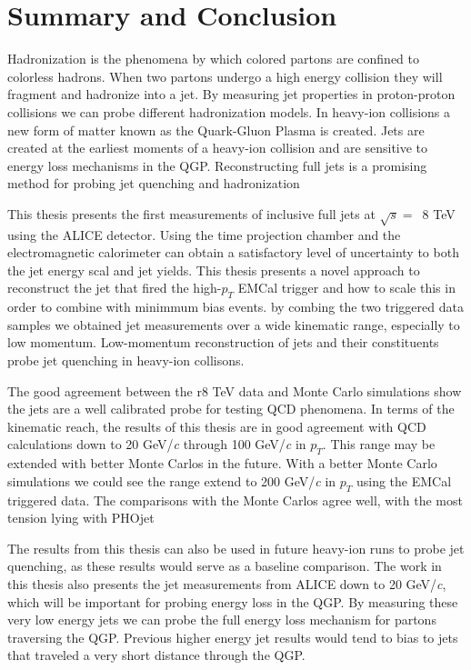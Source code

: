 \section{Summary and Conclusion}

Hadronization is the phenomena by which colored partons are confined to colorless hadrons.  When two partons undergo a high energy collision they will fragment and hadronize into a jet.  By measuring jet properties in proton-proton collisions we can probe different hadronization models.  In heavy-ion collisions a new form of matter known as the Quark-Gluon Plasma is created.  Jets are created at the earliest moments of a heavy-ion collision and are sensitive to energy loss mechanisms in the QGP.  Reconstructing full jets is a promising method for probing jet quenching and hadronization

This thesis presents the first measurements of inclusive full jets at $\sqrt{s} = \,$ 8 TeV using the ALICE detector.  Using the time projection chamber and the electromagnetic calorimeter can obtain a satisfactory level of uncertainty to both the jet energy scal and jet yields.  This thesis presents a novel approach to reconstruct the jet that fired the high-$p_{T}$ EMCal trigger and how to scale this in order to combine with minimmum bias events.  by combing the two triggered data samples we obtained jet measurements over a wide kinematic range, especially to low momentum.  Low-momentum reconstruction of jets and their constituents probe jet quenching in heavy-ion collisons.

The good agreement between the r8 TeV data and Monte Carlo simulations show the jets are a well calibrated probe for testing QCD phenomena.  In terms of the kinematic reach, the results of this thesis are in good agreement with QCD calculations down to 20 GeV/\textit{c} through 100 GeV/\textit{c} in $p_{T}$.  This range may be extended with better Monte Carlos in the future.  With a better Monte Carlo simulations we could see the range extend to 200 GeV/\textit{c} in $p_{T}$ using the EMCal triggered data.  The comparisons with the Monte Carlos agree well, with the most tension lying with PHOjet

The results from this thesis can also be used in future heavy-ion runs to probe jet quenching, as these results would serve as a baseline comparison.  The work in this thesis also presents the jet measurements from ALICE down to 20 GeV/\textit{c}, which will be important for probing energy loss in the QGP.  By measuring these very low energy jets we can probe the full energy loss mechanism for partons traversing the QGP.  Previous higher energy jet results would tend to bias to jets that traveled a very short distance through the QGP.

